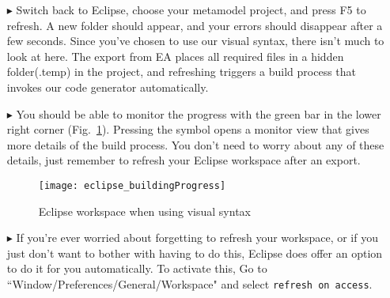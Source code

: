 \begin{itemize}
\item[$\blacktriangleright$] Switch back to Eclipse, choose your metamodel project, and press F5 to refresh. A new folder should appear, and your errors should
disappear after a few seconds. Since you've chosen to use our visual syntax, there isn't much to look at here. The export from EA places all required files in a
hidden folder(.temp) in the project, and refreshing triggers a build process that invokes our code generator automatically. 

\item[$\blacktriangleright$] You should be able to monitor the progress with the green bar in the lower right corner (Fig.~\ref{fig_eclipseBuild}). Pressing the
symbol opens a monitor view that gives more details of the build process. You don't need to worry about any of these details, just remember to refresh your
Eclipse workspace after an export.


\vspace{0.5cm}

\begin{figure}[htbp]
	\centering
  \texttt{[image: eclipse\_buildingProgress]}
	\caption{Eclipse workspace when using visual syntax} 
	\label{fig_eclipseBuild} 
\end{figure}

\vspace{0.5cm}

\item[$\blacktriangleright$] If you're ever worried about forgetting to refresh your workspace, or if you just don't want to bother with having to do this,
Eclipse does offer an option to do it for you automatically. To activate this, Go to ``Window/Preferences/General/Workspace" and select \texttt{refresh on
access}.

\end{itemize}